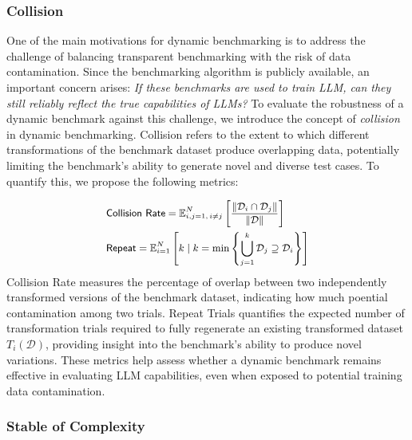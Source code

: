 \subsubsection{Collision}

One of the main motivations for dynamic benchmarking is to address the challenge of balancing transparent benchmarking with the risk of data contamination. Since the benchmarking algorithm is publicly available, an important concern arises:  \textit{If these benchmarks are used to train LLM, can they still reliably reflect the true capabilities of LLMs?}
To evaluate the robustness of a dynamic benchmark against this challenge, we introduce the concept of \textit{collision} in dynamic benchmarking. Collision refers to the extent to which different transformations of the benchmark dataset produce overlapping data, potentially limiting the benchmark’s ability to generate novel and diverse test cases. To quantify this, we propose the following metrics:  

\[
\small
\begin{split}
    & \textsf{Collision Rate} = \mathbb{E}_{\substack{i, j = 1, \, i \neq j}}^{N}  
    \left[ \frac{\lVert \mathcal{D}_i \cap \mathcal{D}_j \rVert }{ \lVert \mathcal{D} \rVert} \right]\\
    & \textsf{Repeat} = \mathbb{E}_{i=1}^{N} \left[ k \mid k = \min \left\{ \bigcup_{j=1}^{k} \mathcal{D}_j \supseteq \mathcal{D}_i \right\} \right]
\end{split}
\]  
\textsf{Collision Rate} measures the percentage of overlap between two independently transformed versions of the benchmark dataset, indicating how much poential contamination among two trials. \textsf{Repeat Trials} quantifies the expected number of transformation trials required to fully regenerate an existing transformed dataset \( T_i(\mathcal{D}) \), providing insight into the benchmark’s ability to produce novel variations.  
These metrics help assess whether a dynamic benchmark remains effective in evaluating LLM capabilities, even when exposed to potential training data contamination.  


\subsubsection{Stable of Complexity}


